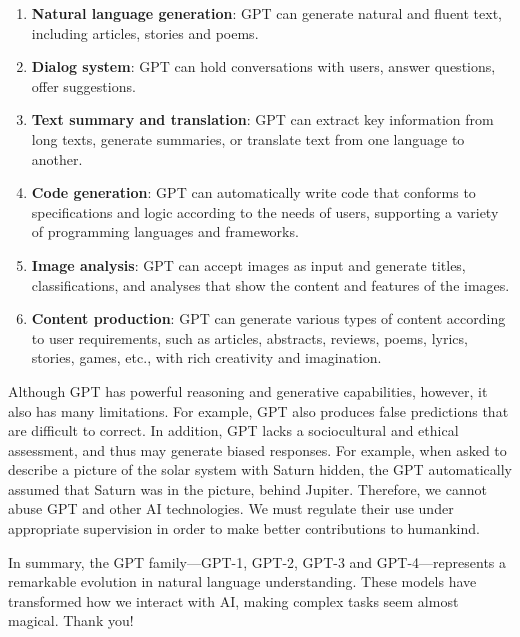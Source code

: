 \documentclass{article}
\begin{document}
\begin{enumerate}

\item\textbf{Natural language generation}: GPT can generate natural and fluent text, including articles, stories and poems.
\item\textbf{Dialog system}: GPT can hold conversations with users, answer questions, offer suggestions.
\item\textbf{Text summary and translation}: GPT can extract key information from long texts, generate summaries, or translate text from one language to another.
\item\textbf{Code generation}: GPT can automatically write code that conforms to specifications and logic according to the needs of users, supporting a variety of programming languages and frameworks.
\item\textbf{Image analysis}: GPT can accept images as input and generate titles, classifications, and analyses that show the content and features of the images.
\item\textbf{Content production}: GPT can generate various types of content according to user requirements, such as articles, abstracts, reviews, poems, lyrics, stories, games, etc., with rich creativity and imagination.

\end{enumerate}

Although GPT has powerful reasoning and generative capabilities, however, it also has many limitations. For example, GPT also produces false predictions that are difficult to correct. In addition, GPT lacks a sociocultural and ethical assessment, and thus may generate biased responses. For example, when asked to describe a picture of the solar system with Saturn hidden, the GPT automatically assumed that Saturn was in the picture, behind Jupiter. Therefore, we cannot abuse GPT and other AI technologies. We must regulate their use under appropriate supervision in order to make better contributions to humankind.

In summary, the GPT family—GPT-1, GPT-2, GPT-3 and GPT-4—represents a remarkable evolution in natural language understanding. These models have transformed how we interact with AI, making complex tasks seem almost magical. Thank you!
 
\end{document}
